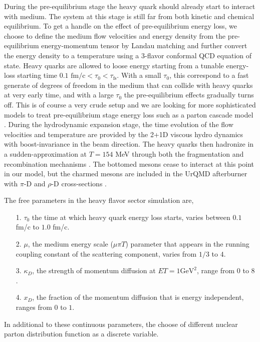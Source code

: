 \documentclass[aps, prc, reprint, amsmath, groupedaddress, nofootinbib]{revtex4-1}
\begin{document}
During the pre-equilibrium stage the heavy quark should already start to interact with medium.
The system at this stage is still far from both kinetic and chemical equilibrium.
To get a handle on the effect of pre-equilibrium energy loss, we choose to define the medium flow velocities and energy density from the pre-equilibrium energy-momentum tensor by Landau matching and further convert the energy density to a temperature using a 3-flavor conformal QCD equation of state. 
Heavy quarks are allowed to loose energy starting from a tunable energy-loss starting time $0.1\textrm{ fm/c} < \tau_0 < \tau_{\textrm{fs}}$. 
With a small $\tau_0$, this correspond to a fast generate of degrees of freedom in the medium that can collide with heavy quarks at very early time, and with a large $\tau_0$ the pre-equilibrium effects gradually turns off.
This is of course a very crude setup and we are looking for more sophisticated models to treat pre-equilibrium stage energy loss such as a parton cascade model \cite{Srivastava:2017bcm}.
During the hydrodynamic expansion stage, the time evolution of the flow velocities and temperature are provided by the 2+1D viscous hydro dynamics with boost-invariance in the beam direction.
The heavy quarks then hadronize in a sudden-approximation at $T = 154$ MeV through both the fragmentation and recombination mechanisms \cite{Cao:2013ita}. 
The bottomed mesons cease to interact at this point in our model, but the charmed mesons are included in the UrQMD afterburner with $\pi$-D and $\rho$-D cross-sections \cite{Lin:2000jp}.

The free parameters in the heavy flavor sector simulation are,
\begin{itemize}
\item[1.] $\tau_0$ the time at which heavy quark energy loss starts, varies between $0.1$ fm/c to $1.0$ fm/c.
\item[2.] $\mu$, the medium energy scale ($\mu\pi T$) parameter that appears in the running coupling constant of the scattering component, varies from $1/3$ to $4$.
\item[3.] $\kappa_D$, the strength of momentum diffusion at $ET = 1 \textrm{GeV}^2$, range from $0$ to $8$.
\item[4.] $x_D$, the fraction of the momentum diffusion that is energy independent, ranges from $0$ to $1$.
\end{itemize}
In additional to these continuous parameters, the choose of different nuclear parton distribution function as a discrete variable.
\end{document}

